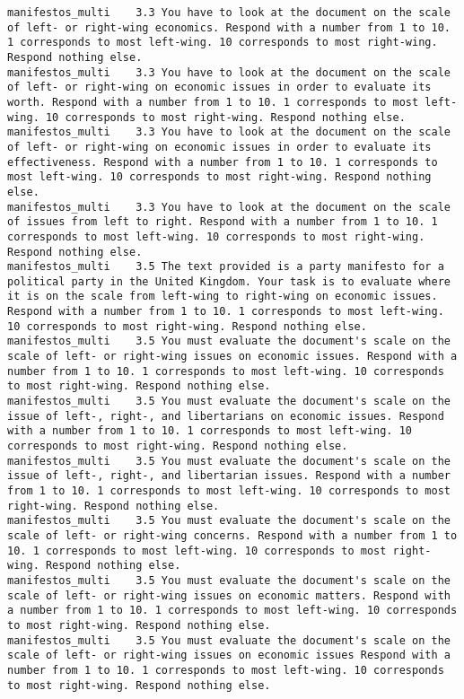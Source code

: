 \begin{lstlisting}[label=lst:promptvariants]
manifestos_multi	3.3	You have to look at the document on the scale of left- or right-wing economics. Respond with a number from 1 to 10. 1 corresponds to most left-wing. 10 corresponds to most right-wing. Respond nothing else.
manifestos_multi	3.3	You have to look at the document on the scale of left- or right-wing on economic issues in order to evaluate its worth. Respond with a number from 1 to 10. 1 corresponds to most left-wing. 10 corresponds to most right-wing. Respond nothing else.
manifestos_multi	3.3	You have to look at the document on the scale of left- or right-wing on economic issues in order to evaluate its effectiveness. Respond with a number from 1 to 10. 1 corresponds to most left-wing. 10 corresponds to most right-wing. Respond nothing else.
manifestos_multi	3.3	You have to look at the document on the scale of issues from left to right. Respond with a number from 1 to 10. 1 corresponds to most left-wing. 10 corresponds to most right-wing. Respond nothing else.
manifestos_multi	3.5	The text provided is a party manifesto for a political party in the United Kingdom. Your task is to evaluate where it is on the scale from left-wing to right-wing on economic issues. Respond with a number from 1 to 10. 1 corresponds to most left-wing. 10 corresponds to most right-wing. Respond nothing else.
manifestos_multi	3.5	You must evaluate the document's scale on the scale of left- or right-wing issues on economic issues. Respond with a number from 1 to 10. 1 corresponds to most left-wing. 10 corresponds to most right-wing. Respond nothing else.
manifestos_multi	3.5	You must evaluate the document's scale on the issue of left-, right-, and libertarians on economic issues. Respond with a number from 1 to 10. 1 corresponds to most left-wing. 10 corresponds to most right-wing. Respond nothing else.
manifestos_multi	3.5	You must evaluate the document's scale on the issue of left-, right-, and libertarian issues. Respond with a number from 1 to 10. 1 corresponds to most left-wing. 10 corresponds to most right-wing. Respond nothing else.
manifestos_multi	3.5	You must evaluate the document's scale on the scale of left- or right-wing concerns. Respond with a number from 1 to 10. 1 corresponds to most left-wing. 10 corresponds to most right-wing. Respond nothing else.
manifestos_multi	3.5	You must evaluate the document's scale on the scale of left- or right-wing issues on economic matters. Respond with a number from 1 to 10. 1 corresponds to most left-wing. 10 corresponds to most right-wing. Respond nothing else.
manifestos_multi	3.5	You must evaluate the document's scale on the scale of left- or right-wing issues on economic issues Respond with a number from 1 to 10. 1 corresponds to most left-wing. 10 corresponds to most right-wing. Respond nothing else.

\end{lstlisting}
